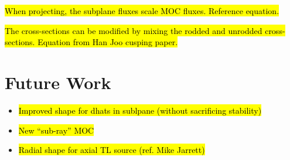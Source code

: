 \hl{When projecting, the subplane fluxes scale MOC fluxes.  Reference equation.}

\hl{The cross-sections can be modified by mixing the rodded and unrodded cross-sections.  Equation from Han Joo cusping paper.}

\section{Future Work}

\begin{itemize}
\item \hl{Improved shape for dhats in sublpane (without sacrificing stability)}
\item \hl{New ``sub-ray'' MOC}
\item \hl{Radial shape for axial TL source (ref. Mike Jarrett)}
\end{itemize}